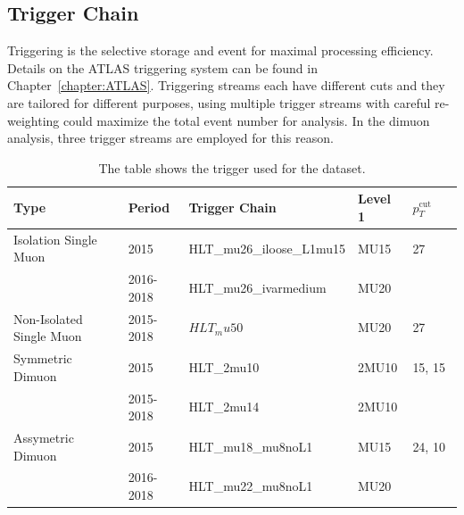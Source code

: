 

\subsection{Trigger Chain}
\label{section:trigger}
Triggering is the selective storage and event for maximal processing efficiency. Details on the ATLAS triggering system can be found in Chapter~\ref{chapter:ATLAS}.
Triggering streams each have different cuts and they are tailored for different purposes, using multiple trigger streams with careful re-weighting could maximize the total event number for analysis. In the dimuon analysis, three trigger streams are employed for this reason.

\begin{table}[!htb]
    \begin{center}
    \caption{
        The table shows the trigger used for the dataset.
    }
\label{tab:Data Trigger}
\begin{tabular}{|l|l|l|l|l}
\hline
\textbf{Type}   & \textbf{Period}                                                         &\textbf{Trigger Chain} &\textbf{Level 1} &\textbf{$p_{T}^{\textrm{cut offline}}$}\\ \hline
Isolation Single Muon   & 2015 & HLT\_mu26\_iloose\_L1mu15 & MU15 & 27 \\ 
                        & 2016-2018  & HLT\_mu26\_ivarmedium    & MU20 & \\ \hline
Non-Isolated Single Muon & 2015-2018                                       &$HLT_mu50$& MU20& 27 \\ \hline
Symmetric Dimuon & 2015 & HLT\_2mu10 & 2MU10 & 15, 15 \\
                 & 2015-2018 & HLT\_2mu14 & 2MU10 & \\ \hline
Assymetric Dimuon & 2015 & HLT\_mu18\_mu8noL1 & MU15 & 24, 10 \\
                  & 2016-2018 & HLT\_mu22\_mu8noL1 & MU20 \\ \hline
\end{tabular}
\end{center}
\end{table}

